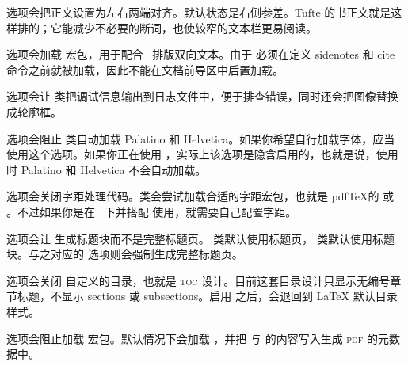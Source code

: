  选项会把正文设置为左右两端对齐。默认状态是右侧参差。Tufte 的书正文就是这样排的；它能减少不必要的断词，也使较窄的文本栏更易阅读。

 选项会加载  宏包，用于配合 \tXeLaTeX\ 排版双向文本。由于  必须在定义 sidenotes 和 cite 命令之前就被加载，因此不能在文档前导区中后置加载。

 选项会让 \TL 类把调试信息输出到日志文件中，便于排查错误，同时还会把图像替换成轮廓框。

 选项会阻止 \TL 类自动加载 Palatino 和 Helvetica。如果你希望自行加载字体，应当使用这个选项。如果你正在使用 \tXeLaTeX，实际上该选项是隐含启用的，也就是说，使用 \tXeLaTeX 时 Palatino 和 Helvetica 不会自动加载。

 选项会关闭字距处理代码。\TL 类会尝试加载合适的字距宏包，也就是 pdf\TeX 的  或 。不过如果你是在 \tXeLaTeX\ 下并搭配  使用，就需要自己配置字距。

 选项会让  生成标题块而不是完整标题页。 类默认使用标题页， 类默认使用标题块。与之对应的  选项则会强制生成完整标题页。

 选项会关闭 \TL 自定义的目录，也就是 \textsc{toc} 设计。目前这套目录设计只显示无编号章节标题，不显示 sections 或 subsections。启用  之后，会退回到 \LaTeX{} 默认目录样式。

 选项会阻止加载  宏包。默认情况下会加载 ，并把  与  的内容写入生成 \textsc{pdf} 的元数据中。

